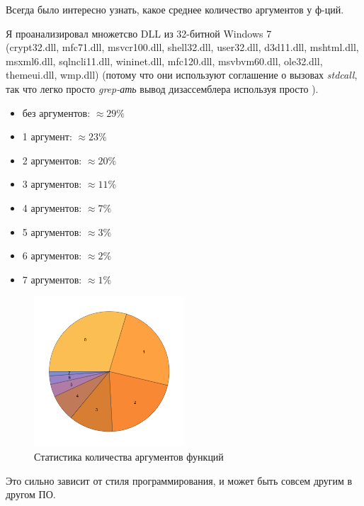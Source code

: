 \label{args_stat}

Всегда было интересно узнать, какое среднее количество аргументов у ф-ций.

Я проанализировал множетсво DLL из 32-битной Windows 7 \\
(crypt32.dll, mfc71.dll, msvcr100.dll, shell32.dll, 
user32.dll, d3d11.dll, mshtml.dll, msxml6.dll, sqlncli11.dll, wininet.dll, mfc120.dll, msvbvm60.dll, ole32.dll, themeui.dll, wmp.dll) 
(потому что они используют соглашение о вызовах \emph{stdcall}, так что легко просто \emph{grep-ать} вывод дизассемблера используя
просто ).

\begin{itemize}
\item без аргументов: $\approx 29\%$
\item 1 аргумент: $\approx 23\%$
\item 2 аргументов: $\approx 20\%$
\item 3 аргументов: $\approx 11\%$
\item 4 аргументов: $\approx 7\%$
\item 5 аргументов: $\approx 3\%$
\item 6 аргументов: $\approx 2\%$
\item 7 аргументов: $\approx 1\%$
\end{itemize}

\begin{figure}[H]
\centering
\includegraphics[width=0.5\textwidth]{other/args_stat.png}
\caption{Статистика количества аргументов функций}
\end{figure}

Это сильно зависит от стиля программирования, и может быть совсем другим в другом ПО.

